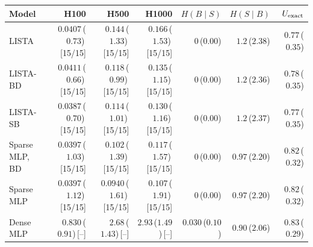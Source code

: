 \begin{tabular}{@{}l rrr rrr@{}}
\toprule
Model & H100 & H500 & H1000 & $H(B\!\mid\!S)$ & $H(S\!\mid\!B)$ & $U_{\rm exact}$ \\
\midrule
LISTA & $0.0407$\,($0.73$)\,[15/15] & $0.144$\,($1.33$)\,[15/15] & $0.166$\,($1.53$)\,[15/15] & $0$\,($0.00$) & $1.2$\,($2.38$) & $0.77$\,($0.35$) \\
LISTA-BD & $0.0411$\,($0.66$)\,[15/15] & $0.118$\,($0.99$)\,[15/15] & $0.135$\,($1.15$)\,[15/15] & $0$\,($0.00$) & $1.2$\,($2.36$) & $0.78$\,($0.35$) \\
LISTA-SB & $0.0387$\,($0.70$)\,[15/15] & $0.114$\,($1.01$)\,[15/15] & $0.130$\,($1.16$)\,[15/15] & $0$\,($0.00$) & $1.2$\,($2.37$) & $0.77$\,($0.35$) \\
Sparse MLP, BD & $0.0397$\,($1.03$)\,[15/15] & $0.102$\,($1.39$)\,[15/15] & $0.117$\,($1.57$)\,[15/15] & $0$\,($0.00$) & $0.97$\,($2.20$) & $0.82$\,($0.32$) \\
Sparse MLP & $0.0397$\,($1.12$)\,[15/15] & $0.0940$\,($1.61$)\,[15/15] & $0.107$\,($1.91$)\,[15/15] & $0$\,($0.00$) & $0.97$\,($2.20$) & $0.82$\,($0.32$) \\
Dense MLP & $0.830$\,($0.91$)\,[--] & $2.68$\,($1.43$)\,[--] & $2.93$\,($1.49$)\,[--] & $0.030$\,($0.10$) & $0.90$\,($2.06$) & $0.83$\,($0.29$) \\
\bottomrule
\end{tabular}